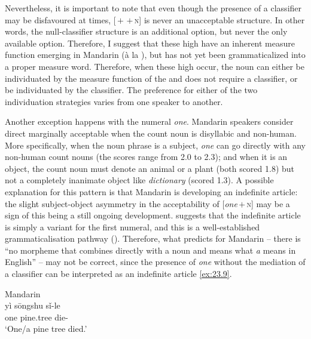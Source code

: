 \documentclass[output=paper]{langsci/langscibook}
\begin{document}
Nevertheless, it is important to note that even though the presence of a
classifier may be disfavoured at times, [\Num{}\,$+$\,\Clf{}\,$+$\,\textsc{n}] is never
an unacceptable structure. In other words, the null-classifier structure is an
additional option, but never the only available option. Therefore, I suggest
that these high  have an inherent measure function emerging in
Mandarin (à la \citealt{Krifka1995}), but has not yet been
grammaticalized into a proper measure word. Therefore,
when these high  occur, the noun can either be individuated by
the measure function of the  and does not require a
classifier, or be individuated by the
classifier. The preference for either of the two individuation
strategies varies from one speaker to another.

Another exception happens with the numeral \emph{one}. Mandarin speakers
consider direct  marginally acceptable when the count noun is
disyllabic and non-human. More specifically, when the noun phrase is a subject,
\emph{one} can go directly with any non-human count nouns (the scores range
from 2.0 to 2.3); and when it is an object, the count noun must denote an
animal or a plant (both scored 1.8) but not a completely inanimate object like
\emph{dictionary} (scored 1.3). A possible explanation for this pattern is
that Mandarin is developing an indefinite article: the slight subject-object
asymmetry in the acceptability of [\emph{one}\,$+$\,\textsc{n}] may be a sign of this being
a still ongoing development. \citet{Chierchia1998} suggests that the indefinite
article is simply a variant for the first numeral, and this is a
well-established grammaticalisation pathway (\citealt{HeineKuteva2002}).
Therefore, what \citeauthor{Chierchia1998} predicts for Mandarin -- there is
“no morpheme that combines directly with a noun and means what \emph{a} means
in English” \parencite[91]{Chierchia1998} -- may not be correct, since the
presence of \emph{one} without the mediation of a classifier
can be interpreted as an indefinite article \eqref{ex:23.9}.

\ea\label{ex:23.9} Mandarin\\
    \gll yì sōngshu sǐ-le\\
    	one pine.tree die-\Pfv{}\\
    \glt `One/a pine tree died.'
\z
\end{document}
